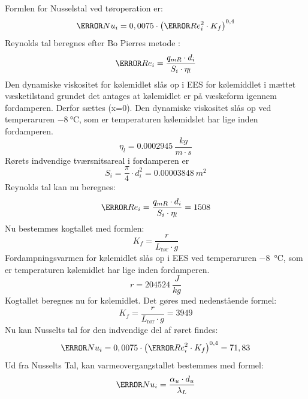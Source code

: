 \documentclass[../Hovedrapport.tex]{subfiles}
\begin{document}
Formlen for Nusselstal ved tøroperation er:
\begin{equation}
\V{Nu_i}  = 0,0075 \cdot   \left( \V{Re} _{i}^{2} \cdot  K_{f} \right) ^{0,4}
\end{equation}
Reynolds tal beregnes efter Bo Pierres metode \citep{koleteknik}:
\begin{equation}
\V{Re} _{i} = \frac{q_{mR} \cdot d_{i}}{ S_{i} \cdot  \eta_{l}}
\end{equation}
Den dynamiske viskositet for kølemidlet slås op i EES for kølemiddlet i mættet væsketilstand grundet det antages at kølemidlet er på væskeform igennem fordamperen. Derfor sættes (x=0). Den dynamiske viskositet slås op ved temperaruren $\SI{-8}{\celsius}$, som er temperaturen kølemidslet har lige inden fordamperen. 
\begin{equation}
\si{\eta_{l}} = \SI{0,0002945}{\frac{kg}{m \cdot s}}
\end{equation}
Rørets indvendige tværsnitsareal i fordamperen er
\begin{equation}
S_{i} = \frac{\pi}{4}\cdot  d_{i}^{2} = \SI{0,00003848}{m^2}
\end{equation}
Reynolds tal kan nu beregnes:
\begin{equation}
\V{Re} _{i} = \frac{q_{mR} \cdot d_{i}}{ S_{i} \cdot  \eta_{l}} = 1508
\end{equation}
Nu bestemmes kogtallet med formlen:
\begin{equation}    
K_{f} = \frac {r}{ L_{\text{rør}}\cdot g}
\end{equation}
Fordampningsvarmen for kølemidlet slås op i EES ved temperaruren \SI{-8}{\celsius}, som er temperaturen kølemidlet har lige inden fordamperen. 
\begin{equation}
r = \SI{204524}{\frac{J}{kg}} 
\end{equation}
Kogtallet beregnes nu for kølemidlet. Det gøres med nedenstående formel:
\begin{equation}    
K_{f} = \frac {r}{ L_{\text{rør}}\cdot g} = 3949
\end{equation}
Nu kan Nusselts tal for den indvendige del af røret findes:
\begin{equation}
\V{Nu_i}  = 0,0075 \cdot   \left( \V{Re} _{i}^{2} \cdot  K_{f} \right) ^{0,4} = 71,83
\end{equation}
Ud fra Nusselts Tal, kan varmeovergangstallet bestemmes med formel:
\begin{equation}
    \V{Nu_i}  = \frac{\alpha_{u} \cdot  d_{u}}{\lambda_{L}}
\end{equation}
\end{document}
